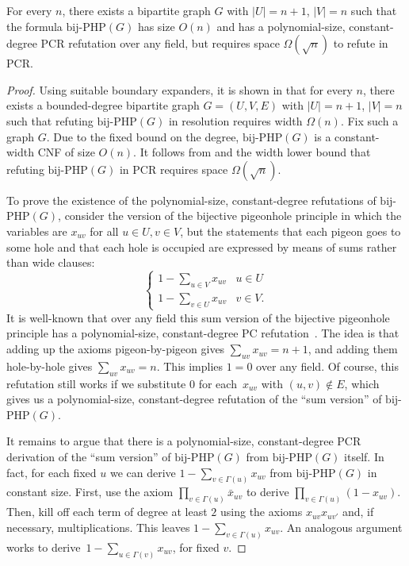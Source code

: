 \begin{theorem}
For every $n$, there exists a bipartite graph $G$ with $|U| = n+1$, 
$|V| =n$ such that the formula $\mathrm{bij}$-$\mathrm{PHP}(G)$ has size $O(n)$
and has a polynomial-size, constant-degree PCR refutation over any field, but requires space $\Omega(\sqrt n)$ to refute in PCR.
\end{theorem}

\begin{proof}
Using suitable boundary expanders, it is shown in \cite[Section 4]{DBLP:journals/fuin/ItsyksonOSS16} that for every $n$, 
there exists a bounded-degree bipartite graph $G=(U,V,E)$ with $|U| = n+1$, $|V| =n$ such that
refuting $\mathrm{bij}$-$\mathrm{PHP}(G)$ in resolution requires width $\Omega(n)$. Fix such a graph $G$.
Due to the fixed bound on the degree, $\mathrm{bij}$-$\mathrm{PHP}(G)$ is a constant-width CNF
of size $O(n)$. It follows from  and the width lower bound
that refuting $\mathrm{bij}$-$\mathrm{PHP}(G)$ in PCR requires space $\Omega(\sqrt n)$.

To prove the existence of the polynomial-size, constant-degree refutations of 
$\mathrm{bij}$-$\mathrm{PHP}(G)$, consider the version of the bijective pigeonhole principle 
in which the variables are $x_{uv}$ for all $u \in U, v \in V$,  
but the statements that each pigeon goes to some hole and that each hole 
is occupied are expressed by means of sums rather than wide clauses:
\[
\left \{
\begin{array}{ll}
1 - \sum_{u \in V} x_{uv}   & u \in U \\
1 - \sum_{v \in U} x_{uv} & v \in V. 
\end{array}
\right.
\]
It is well-known that over any field this sum version of the bijective pigeonhole principle %
has a polynomial-size, constant-degree PC refutation~\cite{riis}. The idea is that adding up the axioms
pigeon-by-pigeon gives $\sum_{uv} x_{uv} = n+1$, and adding them hole-by-hole 
gives $\sum_{uv} x_{uv} = n$. This implies $1 = 0$ over any field. Of course,
this refutation still works if we substitute $0$ for each~$x_{uv}$ with $(u,v) \notin E$,
which gives us a polynomial-size, constant-degree refutation of the ``sum version''
of $\mathrm{bij}$-$\mathrm{PHP}(G)$.

It remains to argue that there is a polynomial-size, constant-degree PCR derivation 
of the ``sum version'' of $\mathrm{bij}$-$\mathrm{PHP}(G)$ from
$\mathrm{bij}$-$\mathrm{PHP}(G)$ itself. 
In fact, for each fixed $u$ we can derive $1 - \sum_{v \in \Gamma(u)} x_{uv}$  
 from $\mathrm{bij}$-$\mathrm{PHP}(G)$
in 
constant size. 
First, use the axiom $\prod_{v \in \Gamma(u)}\bar x_{uv}$ 
to derive $\prod_{v \in \Gamma(u)}(1-x_{uv})$. 
Then, kill off each term of degree at least $2$ using the axioms $x_{uv}x_{uv'}$ and, if necessary, multiplications.
This leaves $1 - \sum_{v \in \Gamma(u)} x_{uv}$.
An analogous argument works to derive~$1 - \sum_{u \in \Gamma(v)} x_{uv}$, for fixed $v$.
\end{proof}




